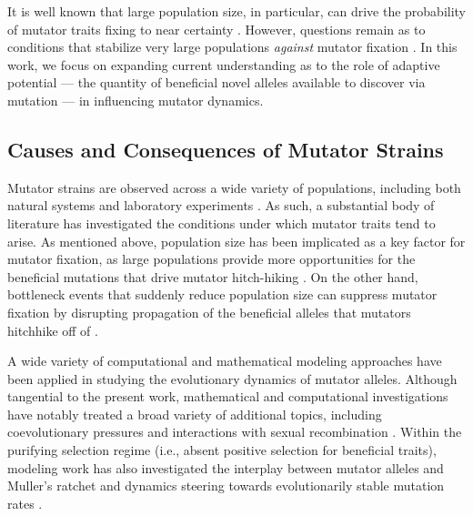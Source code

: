 It is well known that large population size, in particular, can drive the probability of mutator traits fixing to near certainty \citep{raynes2018sign,tenaillon1999mutators,andre2006evolution,good2016evolution}.
However, questions remain as to conditions that stabilize very large populations \textit{against} mutator fixation \citep{raynes2012contrasting,raynes2019migration,tanaka2003evolution}.
In this work, we focus on expanding current understanding as to the role of adaptive potential --- the quantity of beneficial novel alleles available to discover via mutation --- in influencing mutator dynamics.

\subsection{Causes and Consequences of Mutator Strains}

Mutator strains are observed across a wide variety of populations, including both natural systems and laboratory experiments \citep{sniegowski1997evolution,swings2017adaptive,maddamsetti2020divergent,cherry2018methylation,notleymcrobb2002enrichment,shaver2002fitness,voordeckers2015adaptation,leclerc1996high}.
As such, a substantial body of literature has investigated the conditions under which mutator traits tend to arise.
As mentioned above, population size has been implicated as a key factor for mutator fixation, as large populations provide more opportunities for the beneficial mutations that drive mutator hitch-hiking \citep{chao1983competition}.
On the other hand, bottleneck events that suddenly reduce population size can suppress mutator fixation by disrupting propagation of the beneficial alleles that mutators hitchhike off of \citep{raynes2013effect}.

A wide variety of computational and mathematical modeling approaches have been applied in studying the evolutionary dynamics of mutator alleles.
Although tangential to the present work, mathematical and computational investigations have notably treated a broad variety of additional topics, including coevolutionary pressures \citep{pal2007coevolution} and interactions with sexual recombination \citep{johnson1999beneficial}.
Within the purifying selection regime (i.e., absent positive selection for beneficial traits), modeling work has also investigated the interplay between mutator alleles and Muller's ratchet \citep{soderberg2011kickstarting} and dynamics steering towards evolutionarily stable mutation rates \citep{lynch2008cellular}.

